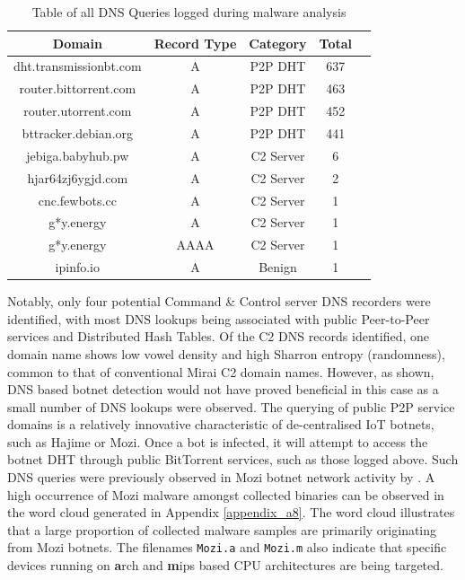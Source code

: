 \begin{table}[!htb]
    \centering
    \caption{Table of all DNS Queries logged during malware analysis}
    \label{tab:dns_queries}
    \begin{tabular}{|c|c|c|c|c|}
    \hline
    \textbf{Domain} & \textbf{Record Type} & \textbf{Category} & \textbf{Total} \\ \hline
    dht.transmissionbt.com & A    & P2P DHT & 637 \\ \hline
    router.bittorrent.com  & A    & P2P DHT &  463 \\ \hline
    router.utorrent.com    & A    & P2P DHT &  452 \\ \hline
    bttracker.debian.org   & A    & P2P DHT &  441 \\ \hline
    jebiga.babyhub.pw      & A    & C2 Server &  6 \\ \hline
    hjar64zj6ygjd.com      & A    & C2 Server  &  2 \\ \hline
    cnc.fewbots.cc         & A    & C2 Server  &  1 \\ \hline
    g*y.energy             & A    & C2 Server  &  1 \\ \hline
    g*y.energy             & AAAA & C2 Server  &  1 \\ \hline
    ipinfo.io              & A    & Benign &  1 \\ \hline
    \end{tabular}
\end{table}

Notably, only four potential Command \& Control server DNS recorders were identified, with most DNS lookups being associated with public Peer-to-Peer services and Distributed Hash Tables. Of the C2 DNS records identified, one domain name shows low vowel density and high Sharron entropy (randomness), common to that of conventional Mirai C2 domain names. \citet{Dwyer2019} However, as shown,  DNS based botnet detection would not have proved beneficial in this case as a small number of DNS lookups were observed. The querying of public P2P service domains is a relatively innovative characteristic of de-centralised IoT botnets, such as Hajime or Mozi. Once a bot is infected, it will attempt to access the botnet DHT through public BitTorrent services, such as those logged above. Such DNS queries were previously observed in Mozi botnet network activity by \citep{Netlab2019}. A high occurrence of Mozi malware amongst collected binaries can be observed in the word cloud generated in Appendix \ref{appendix_a8}. The word cloud illustrates that a large proportion of collected malware samples are primarily originating from Mozi botnets. The filenames \texttt{Mozi.a} and \texttt{Mozi.m} also indicate that specific devices running on \textbf{a}rch and \textbf{m}ips based CPU architectures are being targeted. 

